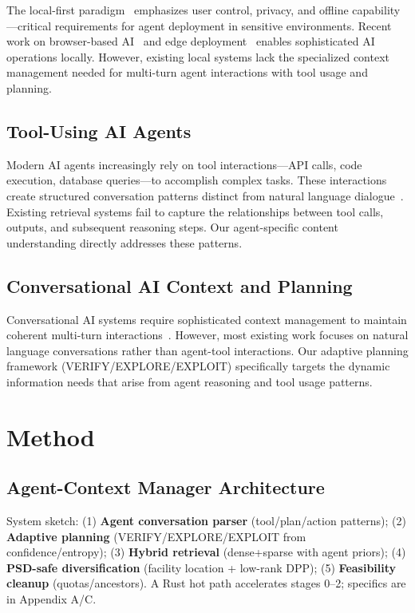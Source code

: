 \documentclass[letterpaper]{article}
\begin{document}
The local-first paradigm~\citep{kleppmann2019local} emphasizes user control, privacy, and offline capability—critical requirements for agent deployment in sensitive environments. Recent work on browser-based AI~\citep{gokaslan2023openelm} and edge deployment~\citep{haas2017bringing} enables sophisticated AI operations locally. However, existing local systems lack the specialized context management needed for multi-turn agent interactions with tool usage and planning.

\subsection{Tool-Using AI Agents}

Modern AI agents increasingly rely on tool interactions—API calls, code execution, database queries—to accomplish complex tasks. These interactions create structured conversation patterns distinct from natural language dialogue~\citep{qu2020open}. Existing retrieval systems fail to capture the relationships between tool calls, outputs, and subsequent reasoning steps. Our agent-specific content understanding directly addresses these patterns.

\subsection{Conversational AI Context and Planning}

Conversational AI systems require sophisticated context management to maintain coherent multi-turn interactions~\citep{yu2021few}. However, most existing work focuses on natural language conversations rather than agent-tool interactions. Our adaptive planning framework (VERIFY/EXPLORE/EXPLOIT) specifically targets the dynamic information needs that arise from agent reasoning and tool usage patterns.

\section{Method}

\subsection{Agent-Context Manager Architecture}

System sketch: (1) \textbf{Agent conversation parser} (tool/plan/action patterns); (2) \textbf{Adaptive planning} (VERIFY/EXPLORE/EXPLOIT from confidence/entropy); (3) \textbf{Hybrid retrieval} (dense+sparse with agent priors); (4) \textbf{PSD-safe diversification} (facility location + low-rank DPP); (5) \textbf{Feasibility cleanup} (quotas/ancestors). A Rust hot path accelerates stages 0–2; specifics are in Appendix A/C.
\end{document}
